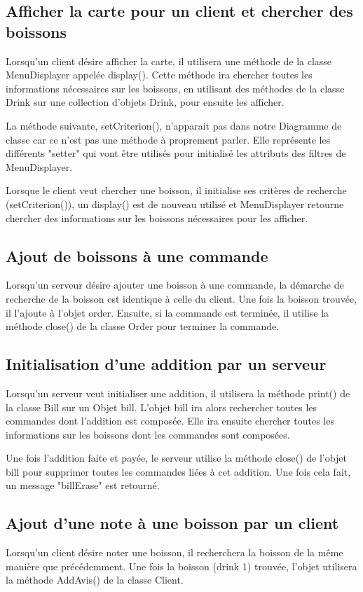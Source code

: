 \subsection{Afficher la carte pour un client et chercher des boissons}
Lorsqu'un client désire afficher la carte, il utilisera une méthode de la classe MenuDisplayer appelée display(). Cette méthode ira chercher toutes les informations nécessaires sur les boissons, en utilisant des méthodes de la classe Drink sur une collection d'objets Drink, pour ensuite les afficher. 

La méthode suivante, setCriterion(), n'apparait pas dans notre Diagramme de classe car ce n'est pas une méthode à proprement parler. Elle représente les différents "setter" qui vont être utilisés pour initialisé les attributs des filtres de MenuDisplayer. 

Lorsque le client veut chercher une boisson, il initialise ses critères de recherche (setCriterion()), un display() est de nouveau utilisé et MenuDisplayer retourne chercher des informations sur les boissons nécessaires pour les afficher. 

\subsection{Ajout de boissons à une commande}

Lorsqu'un serveur désire ajouter une boisson à une commande, la démarche de recherche de la boisson est identique à celle du client. Une fois la boisson trouvée, il l'ajoute à l'objet order. Ensuite, si la commande est terminée, il utilise la méthode close() de la classe Order pour terminer la commande.


\subsection{Initialisation d'une addition par un serveur}
Lorsqu'un serveur veut initialiser une addition, il utilisera la méthode print() de la classe Bill sur un Objet bill. L'objet bill ira alors rechercher toutes les commandes dont l'addition est composée. Elle ira ensuite chercher toutes les informations sur les boissons dont les commandes sont composées.

Une fois l'addition faite et payée, le serveur utilise la méthode close() de l'objet bill pour supprimer toutes les commandes liées à cet addition. Une fois cela fait, un message "billErase" est retourné.

\subsection{Ajout d'une note à une boisson par un client} 

Lorsqu'un client désire noter une boisson, il recherchera la boisson de la même manière que précédemment. Une fois la boisson (drink 1) trouvée, l'objet utilisera la méthode AddAvis() de la classe Client.


